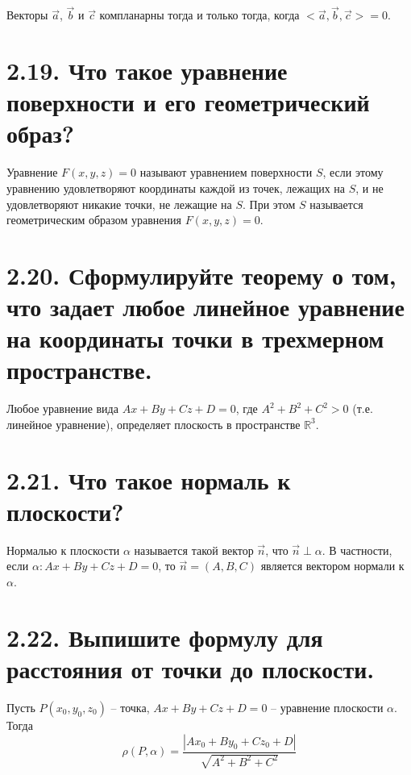 \documentclass{article}
\begin{document}
Векторы $\vec{a}$, $\vec{b}$ и $\vec{c}$ компланарны тогда и только тогда, когда $<\vec{a}, \vec{b}, \vec{c}> = 0$.

\section*{\LARGE 2.19. Что такое уравнение поверхности и его геометрический образ? }

Уравнение $F(x, y, z) = 0$ называют уравнением поверхности $S$, если этому уравнению удовлетворяют координаты каждой из точек, лежащих на $S$, и не удовлетворяют никакие точки, не лежащие на $S$. При этом $S$ называется геометрическим образом уравнения $F(x, y, z) = 0$.

\section*{\LARGE 2.20. Сформулируйте теорему о том, что задает любое линейное уравнение на координаты точки в трехмерном пространстве.  }

Любое уравнение вида $Ax + By + Cz + D = 0$, где $A^2 + B^2 + C^2 > 0$ (т.е. линейное уравнение), определяет плоскость в пространстве $\mathbb{R}^3$.

\section*{\LARGE 2.21. Что такое нормаль к плоскости?  }

Нормалью к плоскости $\alpha$ называется такой вектор $\vec{n}$, что $\vec{n} \perp \alpha$. В частности, если $\alpha : Ax + By + Cz + D = 0$, то $\vec{n} = (A, B, C)$ является вектором нормали к $\alpha$.

\section*{\LARGE 2.22. Выпишите формулу для расстояния от точки до плоскости. }

Пусть $P(x_0, y_0, z_0)$ -- точка, $Ax + By + Cz + D = 0$ -- уравнение плоскости $\alpha$. Тогда 
$$
\rho(P, \alpha) = \frac{|Ax_0 + By_0 + Cz_0 + D|}{\sqrt{A^2 + B^2 + C^2}} 
$$
\end{document}
